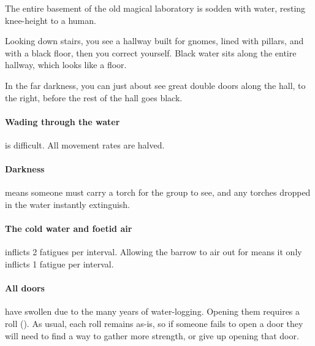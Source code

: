 The entire basement of the old magical laboratory is sodden with water, resting knee-height to a human.

\begin{boxtext}
  Looking down stairs, you see a hallway built for gnomes, lined with pillars, and with a black floor, then you correct yourself.
  Black water sits along the entire hallway, which looks like a floor.

  In the far darkness, you can just about see great double doors along the hall, to the right, before the rest of the hall goes black.

\end{boxtext}


\paragraph{Wading through the water}
is difficult.
All movement rates are halved.

\paragraph{Darkness}
means someone must carry a torch for the group to see, and any torches dropped in the water instantly extinguish.

\paragraph{The cold water and foetid air}
inflicts 2 \glspl{fatigue} per \gls{interval}.
Allowing the barrow to air out for  means it only inflicts 1 \gls{fatigue} per \gls{interval}.

\paragraph{All doors}
have swollen due to the many years of water-logging.
Opening them requires a  roll (\tn[7]).
As usual, each roll remains as-is, so if someone fails to open a door they will need to find a way to gather more strength, or give up opening that door.

